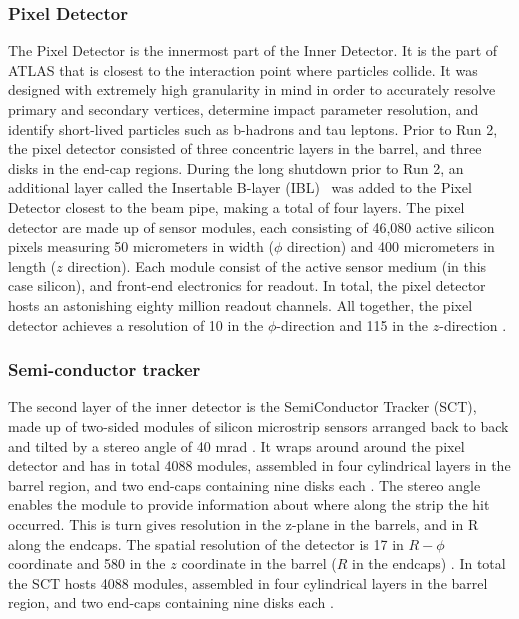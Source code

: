 \subsubsection{Pixel Detector}

The Pixel Detector is the innermost part of the Inner Detector. It is the part of ATLAS that is closest to the interaction point where particles collide. It was designed with extremely high granularity in mind in order to accurately resolve primary and secondary vertices, determine impact parameter resolution, and identify short-lived particles such as b-hadrons and tau leptons. Prior to Run 2, the pixel detector consisted of three concentric layers in the barrel, and three disks in the end-cap regions. During the long shutdown prior to Run 2, an additional layer called the Insertable B-layer (IBL)~\cite{Capeans:1291633} was added to the Pixel Detector closest to the beam pipe, making a total of four layers. The pixel detector are made up of sensor modules, each consisting of 46,080 active silicon pixels measuring 50 micrometers in width ($\phi$ direction) and 400 micrometers in length ($z$ direction). Each module consist of the active sensor medium (in this case silicon), and front-end electronics for readout. In total, the pixel detector hosts an astonishing eighty million readout channels. All together, the pixel detector achieves a resolution of \unit{10}{\micro\meter} in the $\phi$-direction and \unit{115}{\micro\meter} in the $z$-direction .

\subsubsection{Semi-conductor tracker}

The second layer of the inner detector is the SemiConductor Tracker (SCT), made up of two-sided modules of silicon microstrip sensors arranged back to back and tilted by a stereo angle of 40 mrad \cite{AHMAD200798}. It wraps around around the pixel detector and has in total 4088 modules, assembled in four cylindrical layers in the barrel region, and two end-caps containing nine disks each \cite{CERN-LHCC-2017-005}. The stereo angle enables the module to provide information about where along the strip the hit occurred. This is turn gives resolution in the z-plane in the barrels, and in R along the endcaps. The spatial resolution of the detector is \unit{17}{\mu\meter} in $R-\phi$ coordinate and \unit{580}{\mu\meter} in the $z$ coordinate in the barrel ($R$ in the endcaps) \cite{Abdesselam:974073}. In total the SCT hosts 4088 modules, assembled in four cylindrical layers in the barrel region, and two end-caps containing nine disks each \cite{CERN-LHCC-2017-005}. 

